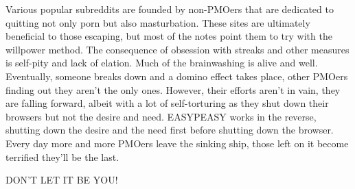Various popular subreddits are founded by non-PMOers that are dedicated to quitting not only porn but also masturbation. These sites are ultimately beneficial to those escaping, but most of the notes point them to try with the willpower method. The consequence of obsession with streaks and other measures is self-pity and lack of elation. Much of the brainwashing is alive and well. Eventually, someone breaks down and a domino effect takes place, other PMOers finding out they aren't the only ones. However, their efforts aren't in vain, they are falling forward, albeit with a lot of self-torturing as they shut down their browsers but not the desire and need. EASYPEASY works in the reverse, shutting down the desire and the need first before shutting down the browser. Every day more and more PMOers leave the sinking ship, those left on it become terrified they'll be the last.

\huge{DON'T LET IT BE YOU!}
